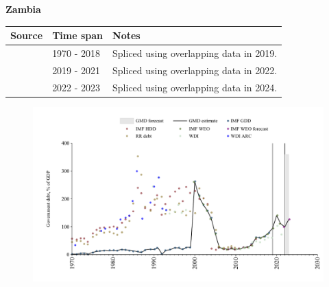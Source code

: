 \documentclass[12pt,a4paper,landscape]{article}
\begin{document}
\begin{adjustbox}{max totalsize={\paperwidth}{\paperheight},center}
\begin{minipage}[t][\textheight][t]{\textwidth}
\vspace*{0.5cm}
{}
\begin{center}
{\Large\bfseries Zambia}
\end{center}
\vspace{0.5cm}
\begin{table}[H]
\centering
\small
\begin{tabular}{|l|l|l|}
\hline
\textbf{Source} & \textbf{Time span} & \textbf{Notes} \\
\hline
\rowcolor{white}\cite{IMF_GDD}& 1970 - 2018 &Spliced using overlapping data in 2019.\\
\rowcolor{lightgray}\cite{IMF_WEO}& 2019 - 2021 &Spliced using overlapping data in 2022.\\
\rowcolor{white}\cite{IMF_WEO_forecast}& 2022 - 2023 &Spliced using overlapping data in 2024.\\
\hline
\end{tabular}
\end{table}
\begin{figure}[H]
\centering
\includegraphics[width=\textwidth,height=0.6\textheight,keepaspectratio]{graphs/ZMB_govdebt_GDP.pdf}
\end{figure}
\end{minipage}
\end{adjustbox}
\end{document}
